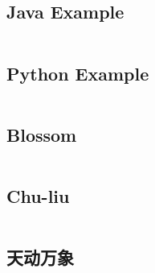\documentclass[titlepage, a4paper]{article}
\begin{document}
\begin{multicols}{2}
\begin{spacing}{0.6}
			\subsection*{Java Example}
				\inputminted{java}{src/Miscellany/Main2.java}
			\subsection*{Python Example}
				\inputminted{python}{src/Miscellany/test.py}
			\subsection*{Blossom}
				\inputminted{python}{src/TreeandGraph/Blossom.cpp}
			\subsection*{Chu-liu}
				\inputminted{cpp}{src/TreeandGraph/最小树形图.cpp}
			\subsection*{天动万象}
				\inputminted{cpp}{src/yzh/ByteCampA3.cpp}
		\end{spacing}
		\endgroup
	\end{multicols}
	
\end{document}
